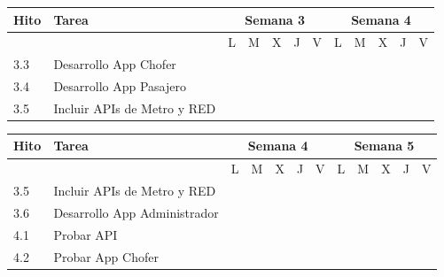 \documentclass[12pt]{article}
\begin{document}
\begin{table}[!h]
\centering
\begin{tabular}{|p{1.5cm}|p{7cm}|*{10}{c|}}
\hline
\textbf{Hito} & \textbf{Tarea} & \multicolumn{5}{c|}{\textbf{Semana 3}} & \multicolumn{5}{c|}{\textbf{Semana 4}} \\
\hline
 & & L & M & X & J & V & L & M & X & J & V \\
\hline
3.3 & Desarrollo App Chofer & \cellcolor{gray} & \cellcolor{gray} & \cellcolor{gray} & \cellcolor{gray} & & & & & & \\
\hline
3.4 & Desarrollo App Pasajero & & & & & \cellcolor{gray}& \cellcolor{gray} & \cellcolor{gray} & \cellcolor{gray} & \cellcolor{gray} &  \\
\hline
3.5 & Incluir APIs de Metro y RED & & & & & & & & \cellcolor{gray} & \cellcolor{gray} & \cellcolor{gray} \\

\hline
\end{tabular}
\end{table}
\begin{table}[!h]
    \centering
    \begin{tabular}{|p{1.5cm}|p{7cm}|*{10}{c|}}
    \hline
    \textbf{Hito} & \textbf{Tarea} & \multicolumn{5}{c|}{\textbf{Semana 4}} & \multicolumn{5}{c|}{\textbf{Semana 5}} \\
    \hline
 & & L & M & X & J & V & L & M & X & J & V \\
    \hline
    3.5 & Incluir APIs de Metro y RED & & & \cellcolor{gray} & \cellcolor{gray} & \cellcolor{gray} & \cellcolor{gray} & \cellcolor{gray} & & & \\
    \hline
    3.6 & Desarrollo App Administrador & & & & & & \cellcolor{gray} & \cellcolor{gray} & \cellcolor{gray} & \cellcolor{gray} & \cellcolor{gray} \\
    \hline
    4.1 & Probar API & \cellcolor{gray} & \cellcolor{gray} & & & & & & & & \\   
    \hline
    4.2 & Probar App Chofer & & \cellcolor{gray} & \cellcolor{gray} & & & & & & & \\
    \hline
    \end{tabular}
\end{table}
\end{document}
